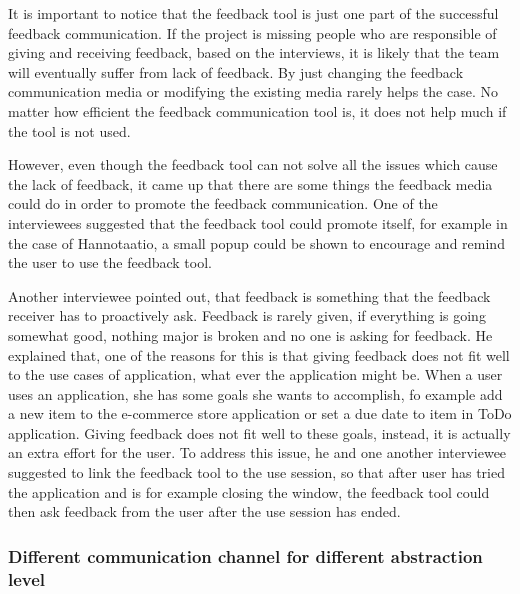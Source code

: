 \documentclass[english,12pt,a4paper,pdftex]{article}
\begin{document}
It is important to notice that the feedback tool is just one part of the successful feedback communication. If the project is missing people who are responsible of giving and receiving feedback, based on the interviews, it is likely that the team will eventually suffer from lack of feedback. By just changing the feedback communication media or modifying the existing media rarely helps the case. No matter how efficient the feedback communication tool is, it does not help much if the tool is not used.

However, even though the feedback tool can not solve all the issues which cause the lack of feedback, it came up that there are some things the feedback media could do in order to promote the feedback communication. One of the interviewees suggested that the feedback tool could promote itself, for example in the case of Hannotaatio, a small popup could be shown to encourage and remind the user to use the feedback tool. 

Another interviewee pointed out, that feedback is something that the feedback receiver has to proactively ask. Feedback is rarely given, if everything is going somewhat good, nothing major is broken and no one is asking for feedback. He explained that, one of the reasons for this is that giving feedback does not fit well to the use cases of application, what ever the application might be. When a user uses an application, she has some goals she wants to accomplish, fo example add a new item to the e-commerce store application or set a due date to item in ToDo application. Giving feedback does not fit well to these goals, instead, it is actually an extra effort for the user. To address this issue, he and one another interviewee suggested to link the feedback tool to the use session, so that after user has tried the application and is for example closing the window, the feedback tool could then ask feedback from the user after the use session has ended.

\subsubsection{Different communication channel for different abstraction level}
\end{document}

